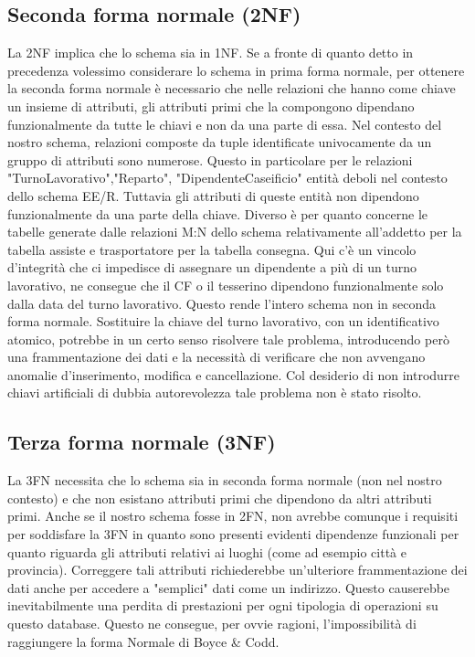 \documentclass[12pt]{report}
\begin{document}
\subsection*{Seconda forma normale (2NF)}
La 2NF implica che lo schema sia in 1NF. Se a fronte di quanto detto in precedenza volessimo considerare lo schema in prima forma normale, per ottenere la seconda forma normale è necessario che nelle relazioni che hanno come chiave un insieme di attributi, gli attributi primi che la compongono dipendano funzionalmente da tutte le chiavi e non da una parte di essa.
\newline\newline
Nel contesto del nostro schema, relazioni composte da tuple identificate univocamente da un gruppo di attributi sono numerose. Questo in particolare per le relazioni "TurnoLavorativo","Reparto", "DipendenteCaseificio"  entità deboli nel contesto dello schema EE/R. Tuttavia gli attributi di queste entità non dipendono funzionalmente da una parte della chiave. 
\newline\newline
Diverso è per quanto concerne le tabelle generate dalle relazioni M:N dello schema relativamente all'addetto per la tabella assiste e trasportatore per la tabella consegna. Qui c'è un vincolo d'integrità che ci impedisce di assegnare un dipendente a più di un turno lavorativo, ne consegue che il CF o il tesserino dipendono funzionalmente solo dalla data del turno lavorativo. Questo rende l'intero schema non in seconda forma normale.
\newline\newline
Sostituire la chiave del turno lavorativo, con un identificativo atomico, potrebbe in un certo senso risolvere tale problema, introducendo però una frammentazione dei dati e la necessità di verificare che non avvengano anomalie d'inserimento, modifica e cancellazione.
\newline\newline
Col desiderio di non introdurre chiavi artificiali di dubbia autorevolezza tale problema non è stato risolto.
\subsection*{Terza forma normale (3NF)}
La 3FN necessita che lo schema sia in seconda forma normale (non nel nostro contesto) e che non esistano attributi primi che dipendono da altri attributi primi. 
\newline\newline
Anche se il nostro schema fosse in 2FN, non avrebbe comunque i requisiti per soddisfare la 3FN in quanto sono presenti evidenti dipendenze funzionali per quanto riguarda gli attributi relativi ai luoghi (come ad esempio città e provincia). Correggere tali attributi richiederebbe un'ulteriore frammentazione dei dati anche per accedere a "semplici" dati come un indirizzo. Questo causerebbe inevitabilmente una perdita di prestazioni per ogni tipologia di operazioni su questo database.
\newline\newline
Questo ne consegue, per ovvie ragioni, l'impossibilità di raggiungere la forma Normale di Boyce \& Codd.
\end{document}
